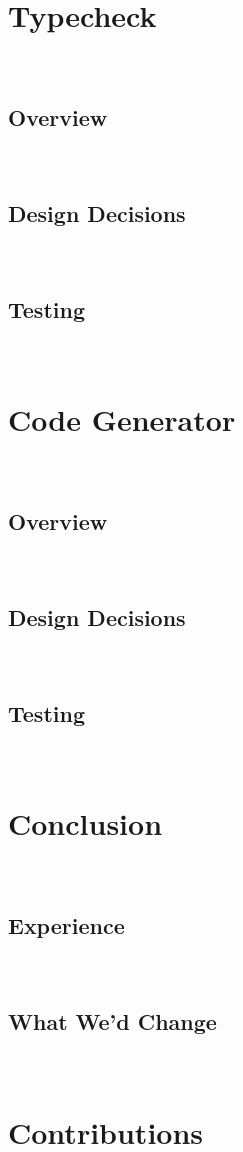 \documentclass[11pt]{article}
\begin{document}
\section{Typecheck}~%
\subsection{Overview}~%
\subsection{Design Decisions}~%
\subsection{Testing}~%
\section{Code Generator}~%
\subsection{Overview}~%
\subsection{Design Decisions}~%
\subsection{Testing}~%
\section{Conclusion}~%
\subsection{Experience}~%
\subsection{What We'd Change}~%
\section{Contributions}~%
\end{document}
